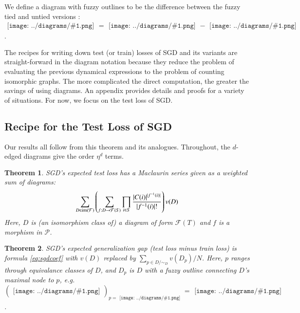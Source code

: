 \documentclass{article}
\newtheorem{thm}{Theorem}
\newcommand{\Free}{\mathcal{F}}
\newcommand{\image}{\text{\textnormal{im}}}
\newcommand{\Pp}{\mathcal{P}}
\newcommand{\sdia}[1]{\begin{gathered}\texttt{[image: ../diagrams/\#1.png]}\end{gathered}}
\begin{document}
    We define a diagram with fuzzy outlines to be the difference between the
    fuzzy tied and untied versions : $\sdia{c(01-2)(01-12)} =
    \sdia{(01-2)(01-12)}-\sdia{(0-1-2)(01-12)}$. 
    
    The recipes for writing down test (or train) losses of SGD and its variants
    are straight-forward in the diagram notation because they reduce the
    problem of evaluating the previous dynamical expressions to the problem of
    counting isomorphic graphs.  The more complicated the direct computation,
    the greater the savings of using diagrams.  An appendix provides details
    and proofs for a variety of situations.  For now, we focus on the test loss
    of SGD.

\subsection{Recipe for the Test Loss of SGD}
    Our results all follow from this theorem and its analogues.
    Throughout, the $d$-edged diagrams give the order $\eta^d$ terms. 
    \begin{thm} \label{thm:test}
        SGD's expected test loss has a Maclaurin series
        given as a weighted sum of diagrams:
        \begin{equation}\label{eq:sgdcoef}
            \sum_{D \in \image(\Free)}
            \left(
                \sum_{f: D\to\Free(S)}
                \prod_{i\in S} \frac{|C(i)|^{|f^{-1}(i)|}}{|f^{-1}(i)|!}
            \right)
            v(D) 
        \end{equation}
        Here, $D$ is (an isomorphism class of) a diagram of form
        $\Free(T)$ and $f$ is a morphism in $\Pp$.
    \end{thm}
    \begin{thm}
        SGD's expected generalization gap (test loss minus train loss) is
        formula \ref{eq:sgdcoef} with $v(D)$ replaced by
        $
            \sum_{p \in D/\sim_D} v(D_p)/N
        $.
        Here, $p$ ranges through equivalance classes of $D$, and $D_p$ is $D$
        with a fuzzy outline connecting $D$'s maximal node to $p$,
        e.g. $(\sdia{(0-1)(01)})_{p=\sdia{(0)()}} = \sdia{c(01)(01)}$.
    \end{thm}
\end{document}
